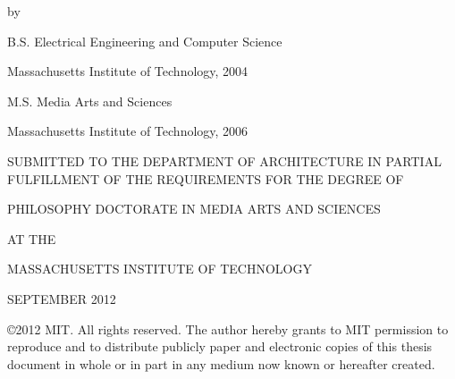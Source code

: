 \thispagestyle{empty}
\begin{addmargin}[-1cm]{-3cm}
\begin{center}
    \begingroup
        \color{Maroon}\spacedallcaps{\myTitle}
    \endgroup

    \vspace{2mm}

    by

    \vspace{2mm}

    \spacedlowsmallcaps{\myName}

    \vspace{5mm}
    
    B.S. Electrical Engineering and Computer Science
    
    Massachusetts Institute of Technology, 2004
    
    \vspace{2mm}

    M.S. Media Arts and Sciences
    
    Massachusetts Institute of Technology, 2006
    
    \vspace{5mm}

SUBMITTED TO THE DEPARTMENT OF ARCHITECTURE IN PARTIAL
FULFILLMENT OF THE REQUIREMENTS FOR THE DEGREE OF

    \vspace{5mm}

PHILOSOPHY DOCTORATE IN MEDIA ARTS AND SCIENCES

AT THE

MASSACHUSETTS INSTITUTE OF TECHNOLOGY

    \vspace{5mm}

SEPTEMBER 2012

    \vspace{5mm}

\copyright 2012 MIT.  All rights reserved.
The author hereby grants to MIT permission to reproduce
and to distribute publicly paper and electronic
copies of this thesis document in whole or in part
in any medium now known or hereafter created.

    \vspace{5mm}

\end{center}        


\end{addmargin}
